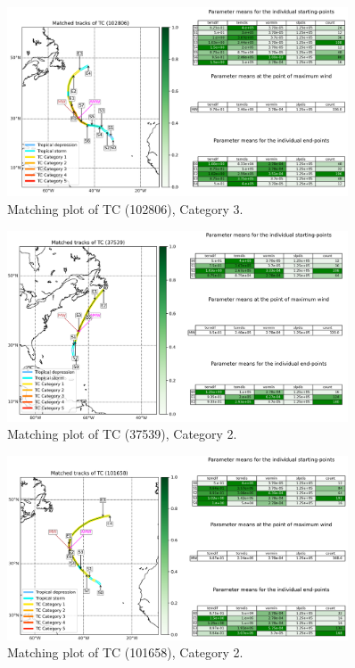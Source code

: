 \begin{figure}[ht]
	\centering
	\includegraphics[width=0.9\textwidth]{img/B_matching_plot_reasonable_amw_ref_01_tc102806_param_id149_cat3.png}
	\caption{Matching plot of TC (102806), Category 3.}
\end{figure}
\begin{figure}[ht]
	\centering
	\includegraphics[width=0.9\textwidth]{img/B_matching_plot_reasonable_amw_rm_10_tc37539_param_id149_cat2.png}
	\caption{Matching plot of TC (37539), Category 2.}
\end{figure}
\begin{figure}[ht]
	\centering
	\includegraphics[width=0.9\textwidth]{img/B_matching_plot_reasonable_amw_ref_03_tc101658_param_id149_cat2.png}
	\caption{Matching plot of TC (101658), Category 2.}
\end{figure}

